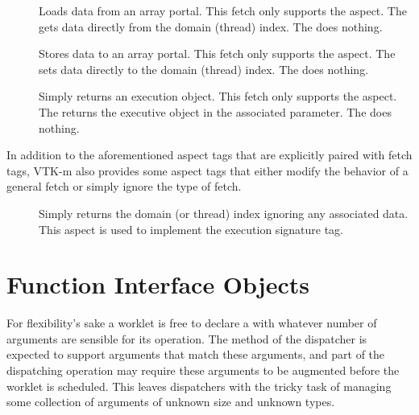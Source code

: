 
\begin{description}
\item[] 
  Loads data from an array portal. This fetch only supports the
   aspect. The  gets data
  directly from the domain (thread) index. The  does
  nothing.
\item[] 
  Stores data to an array portal. This fetch only supports the
   aspect. The  sets data
  directly to the domain (thread) index. The  does nothing.
\item[] 
  Simply returns an execution object. This fetch only supports the
   aspect. The  returns the
  executive object in the associated parameter. The  does
  nothing.
\end{description}

In addition to the aforementioned aspect tags that are explicitly paired
with fetch tags, VTK-m also provides some aspect tags that either modify
the behavior of a general fetch or simply ignore the type of fetch.

\begin{description}
\item[]  Simply
  returns the domain (or thread) index ignoring any associated data. This
  aspect is used to implement the  execution signature
  tag.
\end{description}



\section{Function Interface Objects}
\label{sec:FunctionInterfaceObjects}


For flexibility's sake a worklet is free to declare a \controlsignature
with whatever number of arguments are sensible for its operation. The
 method of the dispatcher is expected to support arguments
that match these arguments, and part of the dispatching operation may
require these arguments to be augmented before the worklet is
scheduled. This leaves dispatchers with the tricky task of managing some
collection of arguments of unknown size and unknown types.

